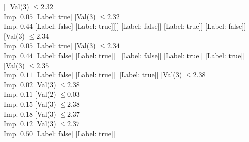 \documentclass[margin=10pt]{standalone}
\begin{document}
\begin{forest}
												[Val($3$) $ \leq 2.35$ \\ Imp. $0.03$
													[Val($2$) $ \leq 0.03$ \\ Imp. $0.01$
														[Val($3$) $ \leq 2.35$ \\ Imp. $0.01$
															[Val($3$) $ \leq 2.34$ \\ Imp. $0.05$
																[Val($3$) $ \leq 2.33$ \\ Imp. $0.01$
																	[Val($3$) $ \leq 2.33$ \\ Imp. $0.08$
																		[Val($3$) $ \leq 2.33$ \\ Imp. $0.02$
																			[Val($3$) $ \leq 2.33$ \\ Imp. $0.10$
																				[Val($3$) $ \leq 2.32$ \\ Imp. $0.02$
																					[Val($3$) $ \leq 2.31$ \\ Imp. $0.44$
																						[Label: true]
																						[Label: false]]
																					[Val($3$) $ \leq 2.32$ \\ Imp. $0.05$
																						[Label: true]
																						[Val($3$) $ \leq 2.32$ \\ Imp. $0.44$
																							[Label: false]
																							[Label: true]]]]
																				[Label: false]]
																			[Label: true]]
																		[Label: false]]
																	[Val($3$) $ \leq 2.34$ \\ Imp. $0.05$
																		[Label: true]
																		[Val($3$) $ \leq 2.34$ \\ Imp. $0.44$
																			[Label: false]
																			[Label: true]]]]
																[Label: false]]
															[Label: true]]
														[Label: true]]
													[Val($3$) $ \leq 2.35$ \\ Imp. $0.11$
														[Label: false]
														[Label: true]]]
												[Label: true]]
											[Val($3$) $ \leq 2.38$ \\ Imp. $0.02$
												[Val($3$) $ \leq 2.38$ \\ Imp. $0.11$
													[Val($2$) $ \leq 0.03$ \\ Imp. $0.15$
														[Val($3$) $ \leq 2.38$ \\ Imp. $0.18$
															[Val($3$) $ \leq 2.37$ \\ Imp. $0.12$
																[Val($3$) $ \leq 2.37$ \\ Imp. $0.50$
																	[Label: false]
																	[Label: true]]

\end{forest}
\end{document}
